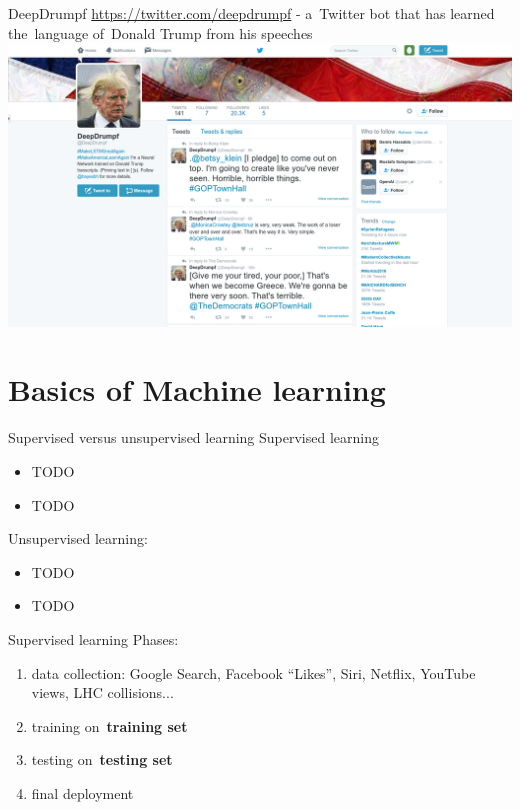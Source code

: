 \documentclass{beamer}
\newcommand{\todo}{\alert{TODO}}
\begin{document}
  {
    \begin{frame}{DeepDrumpf}
      \url{https://twitter.com/deepdrumpf}
      \pause
      - a~Twitter bot that has learned the~language of~Donald Trump from his speeches 
      \includegraphics[width=\textwidth]{../img/DeepDrumpf.png}
    \end{frame}
  }


  \section{Basics of Machine learning}

  \begin{frame}{Supervised versus unsupervised learning}
    Supervised learning
    \begin{itemize}[<+- | alert@+>]
      \item \todo
      \item \todo
    \end{itemize}
    \pause

    Unsupervised learning:
    \begin{itemize}[<+- | alert@+>]
      \item \todo
      \item \todo
    \end{itemize}
  \end{frame}

  \begin{frame}{Supervised learning}
    Phases:
    \pause
    \begin{enumerate}[<+- | alert@+>]
      \item data collection: Google Search, Facebook ``Likes'', Siri, Netflix, YouTube views, LHC collisions...
      \item training on~\textbf{training set}
      \item testing on~\textbf{testing set}
      \item final deployment
    \end{enumerate}
    \pause
  \end{frame}
\end{document}
